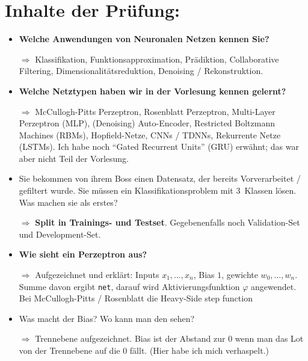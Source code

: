 \documentclass[a4paper]{article}
\begin{document}
\section*{Inhalte der Prüfung:}
    \begin{itemize}
        \item \textbf{Welche Anwendungen von Neuronalen Netzen kennen Sie?}
        \item[$\Rightarrow$] Klassifikation, Funktionsapproximation, Prädiktion,
                             Collaborative Filtering, Dimensionalitätsreduktion,
                             Denoising / Rekonstruktion.
        \item \textbf{Welche Netztypen haben wir in der Vorlesung kennen gelernt?}
        \item[$\Rightarrow$] McCullogh-Pitts Perzeptron, Rosenblatt Perzeptron,
                             Multi-Layer Perzeptron (MLP), (Denoising)
                             Auto-Encoder, Restricted Boltzmann Machines (RBMs),
                             Hopfield-Netze, CNNs / TDNNs, Rekurrente Netze
                             (LSTMs). Ich habe noch \enquote{Gated Recurrent Units} (GRU)
                             erwähnt; das war aber nicht Teil der Vorlesung.
        \item Sie bekommen von ihrem Boss einen Datensatz, der bereits
              Vorverarbeitet / gefiltert wurde. Sie müssen ein
              Klassifikationsproblem mit 3~Klassen lösen. Was machen sie als
              erstes?
        \item[$\Rightarrow$] \textbf{Split in Trainings- und Testset}. Gegebenenfalls
                             noch Validation-Set und Development-Set.
        \item \textbf{Wie sieht ein Perzeptron aus?}
        \item[$\Rightarrow$] Aufgezeichnet und erklärt: Inputs $x_1, \dots, x_n$,
                             Bias $1$, gewichte $w_0, \dots, w_n$. Summe davon
                             ergibt \texttt{net}, darauf wird
                             Aktivierungsfunktion $\varphi$ angewendet. Bei
                             McCullogh-Pitts / Rosenblatt die Heavy-Side
                             step function
        \item Was macht der Bias? Wo kann man den sehen?
        \item[$\Rightarrow$] Trennebene aufgezeichnet. Bias ist der Abstand
                             zur 0 wenn man das Lot von der Trennebene auf
                             die 0 fällt. (Hier habe ich mich verhaspelt.)

\end{itemize}
\end{document}
